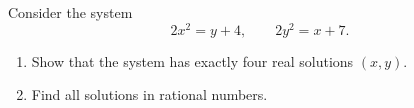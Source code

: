 Consider the system
\[
2x^2=y+4,\qquad 2y^2=x+7 .
\]
\begin{enumerate}
\item[(a)] Show that the system has exactly four real solutions $(x,y)$.
\item[(b)] Find all solutions in rational numbers.
\end{enumerate}
